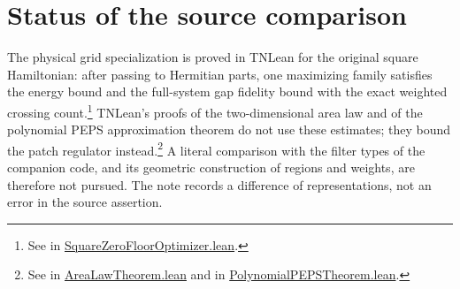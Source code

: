 \documentclass{article}
\begin{document}
\section{Status of the source comparison}

The physical grid specialization is proved in TNLean for the original
square Hamiltonian: after passing to Hermitian parts, one maximizing
family satisfies the energy bound and the full-system gap fidelity bound
with the exact weighted crossing count.\footnote{See
in
\href{https://github.com/LionSR/TNLean/blob/442d18ba754ece8b979097f534316fc0ca52e661/TNLean/PEPS/Approximation/SquareZeroFloorOptimizer.lean\#L53-L135}{SquareZeroFloorOptimizer.lean}.}
TNLean's proofs of the two-dimensional area law and of the polynomial
PEPS approximation theorem do not use these estimates; they bound the
patch regulator instead.\footnote{See
 in
\href{https://github.com/LionSR/TNLean/blob/442d18ba754ece8b979097f534316fc0ca52e661/TNLean/PEPS/AreaLaw/AreaLawTheorem.lean\#L45-L47}{AreaLawTheorem.lean}
and  in
\href{https://github.com/LionSR/TNLean/blob/442d18ba754ece8b979097f534316fc0ca52e661/TNLean/PEPS/Approximation/PolynomialPEPSTheorem.lean\#L55-L56}{PolynomialPEPSTheorem.lean}.}
A literal comparison with the filter types of the companion code, and
its geometric construction of regions and weights, are therefore not
pursued. The note records a difference of representations, not an
error in the source assertion.



\end{document}
